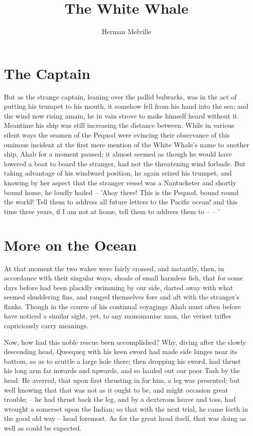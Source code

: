 \documentclass{article}
\begin{document}
\title{The White Whale}
\author{Herman Melville}
\maketitle

\section*{The Captain}

 But as the strange captain, leaning over the pallid bulwarks, was in the act of putting his trumpet to his mouth, it somehow fell from his hand into the sea; and the wind now rising amain, he in vain strove to make himself heard without it. Meantime his ship was still increasing the distance between. While in various silent ways the seamen of the Pequod were evincing their observance of this ominous incident at the first mere mention of the White Whale's name to another ship, Ahab for a moment paused; it almost seemed as though he would have lowered a boat to board the stranger, had not the threatening wind forbade. But taking advantage of his windward position, he again seized his trumpet, and knowing by her aspect that the stranger vessel was a Nantucketer and shortly bound home, he loudly hailed -- 'Ahoy there! This is the Pequod, bound round the world! Tell them to address all future letters to the Pacific ocean! and this time three years, if I am not at home, tell them to address them to -- -- '

\section{More on the Ocean}

   At that moment the two wakes were fairly crossed, and instantly, then, in accordance with their singular ways, shoals of small harmless fish, that for some days before had been placidly swimming by our side, darted away with what seemed shuddering fins, and ranged themselves fore and aft with the stranger's flanks. Though in the course of his continual voyagings Ahab must often before have noticed a similar sight, yet, to any monomaniac man, the veriest trifles capriciously carry meanings. 

Now, how had this noble rescue been accomplished? Why, diving after the slowly descending head, Queequeg with his keen sword had made side lunges near its bottom, so as to scuttle a large hole there; then dropping his sword, had thrust his long arm far inwards and upwards, and so hauled out our poor Tash by the head. He averred, that upon first thrusting in for him, a leg was presented; but well knowing that that was not as it ought to be, and might occasion great trouble; -- he had thrust back the leg, and by a dexterous heave and toss, had wrought a somerset upon the Indian; so that with the next trial, he came forth in the good old way -- head foremost. As for the great head itself, that was doing as well as could be expected.
\end{document}

